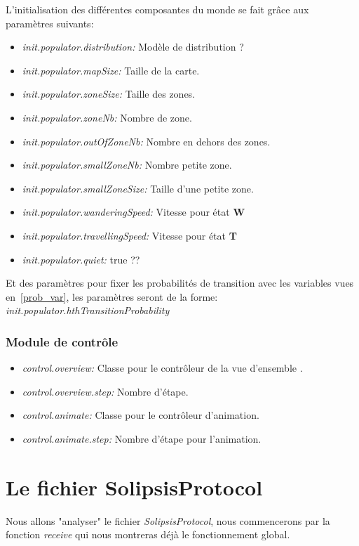 \documentclass[11pt,a4paper]{article}
\begin{document}
L'initialisation des différentes composantes du monde se fait grâce aux paramètres suivants:
\begin{itemize}
        \renewcommand{\labelitemi}{$\bullet$}
	\item \textit{init.populator.distribution:} Modèle de distribution ?
	\item \textit{init.populator.mapSize:} Taille de la carte.
	\item \textit{init.populator.zoneSize:} Taille des zones.
	\item \textit{init.populator.zoneNb:} Nombre de zone.
	\item \textit{init.populator.outOfZoneNb:} Nombre en dehors des zones.
	\item \textit{init.populator.smallZoneNb:} Nombre petite zone.
	\item \textit{init.populator.smallZoneSize:} Taille d'une petite zone.
	\item \textit{init.populator.wanderingSpeed:} Vitesse pour état \textbf{W}
	\item \textit{init.populator.travellingSpeed:} Vitesse pour état \textbf{T} 
	\item \textit{init.populator.quiet:} true  ??
\end{itemize}
Et des paramètres pour fixer les probabilités de transition avec les variables vues en~\ref{prob_var}, les paramètres seront de la forme: \textit{init.populator.hthTransitionProbability} 

\subsubsection{Module de contrôle}
\begin{itemize}
        \renewcommand{\labelitemi}{$\bullet$}
	\item \textit{control.overview:} Classe pour le contrôleur de la vue d'ensemble .
	\item \textit{control.overview.step:} Nombre d'étape.
	\item \textit{control.animate:} Classe pour le contrôleur d'animation.
	\item \textit{control.animate.step:} Nombre d'étape pour l'animation.
\end{itemize}

\section{Le fichier SolipsisProtocol}
Nous allons "analyser" le fichier \textit{SolipsisProtocol}, nous commencerons par la fonction \textit{receive} qui nous montreras déjà le fonctionnement global. 

\newpage




 
\end{document}
